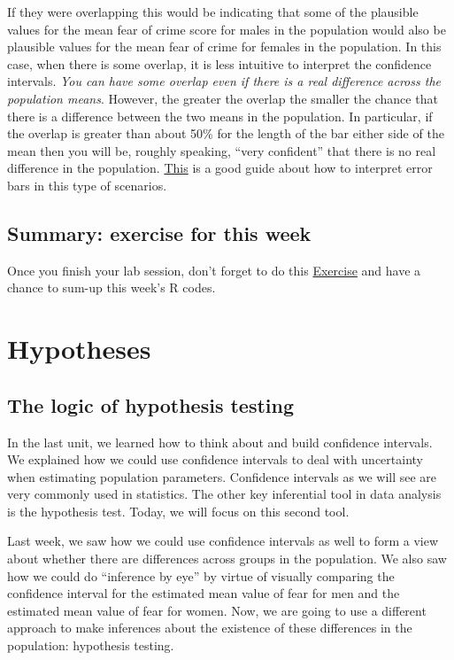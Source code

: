 \documentclass[
]{book}
\begin{document}
If they were overlapping this would be indicating that some of the plausible values for the mean fear of crime score for males in the population would also be plausible values for the mean fear of crime for females in the population. In this case, when there is some overlap, it is less intuitive to interpret the confidence intervals. \emph{You can have some overlap even if there is a real difference across the population means}. However, the greater the overlap the smaller the chance that there is a difference between the two means in the population. In particular, if the overlap is greater than about 50\% for the length of the bar either side of the mean then you will be, roughly speaking, ``very confident'' that there is no real difference in the population. \href{http://www.apastyle.org/manual/related/cumming-and-finch.pdf}{This} is a good guide about how to interpret error bars in this type of scenarios.

\section{Summary: exercise for this week}\label{summary-exercise-for-this-week-4}

Once you finish your lab session, don't forget to do this \href{https://eonk.shinyapps.io/MCD_ex}{Exercise} and have a chance to sum-up this week's R codes.

\chapter{Hypotheses}\label{hypotheses}

\section{The logic of hypothesis testing}\label{the-logic-of-hypothesis-testing}

In the last unit, we learned how to think about and build confidence intervals. We explained how we could use confidence intervals to deal with uncertainty when estimating population parameters. Confidence intervals as we will see are very commonly used in statistics. The other key inferential tool in data analysis is the hypothesis test. Today, we will focus on this second tool.

Last week, we saw how we could use confidence intervals as well to form a view about whether there are differences across groups in the population. We also saw how we could do ``inference by eye'' by virtue of visually comparing the confidence interval for the estimated mean value of fear for men and the estimated mean value of fear for women. Now, we are going to use a different approach to make inferences about the existence of these differences in the population: hypothesis testing.
\end{document}
